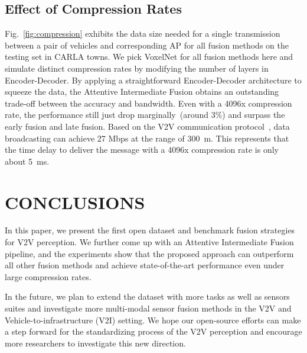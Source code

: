 \documentclass[letterpaper, 10 pt, conference]{ieeeconf}
\begin{document}
\subsection{Effect of Compression Rates}
Fig.~\ref{fig:compression} exhibits the data size needed for a single transmission between a pair of vehicles and corresponding AP for all fusion methods on the testing set in CARLA towns. We pick VoxelNet for all fusion methods here and simulate distinct compression rates by modifying the number of layers in Encoder-Decoder. By applying a straightforward Encoder-Decoder architecture to squeeze the data, the Attentive Intermediate Fusion obtains an outstanding trade-off between the accuracy and bandwidth. Even with a 4096x compression rate, the performance still just drop marginally~(around 3\%) and surpass the early fusion and late fusion. Based on the V2V communication protocol~\cite{arena2019overview}, data broadcasting can achieve 27 Mbps at the range of 300~m. This represents that the time delay to deliver the message with a 4096x compression rate is only about 5~ms. 







\section{CONCLUSIONS}
In this paper, we present the first open dataset and benchmark fusion strategies for V2V perception. We further come up with an Attentive Intermediate Fusion pipeline, and the experiments show that the proposed approach can outperform all other fusion methods and achieve state-of-the-art performance even under large compression rates. 

In the future, we plan to extend the dataset with more tasks as well as sensors suites and investigate more multi-modal sensor fusion methods in the V2V and Vehicle-to-infrastructure (V2I) setting. We hope our open-source efforts can make a step forward for the standardizing process of the V2V perception and encourage more researchers to investigate this new direction. 







\addtolength{\textheight}{-3cm}   















\end{document}
